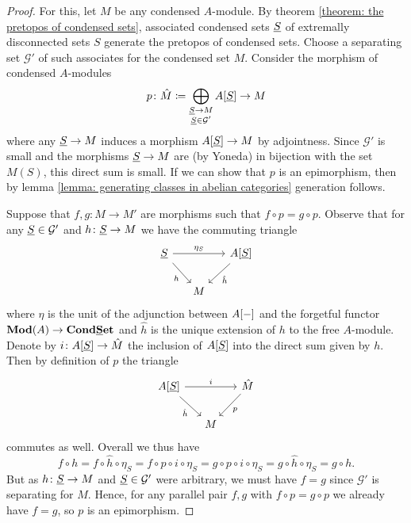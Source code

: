 \begin{proof}
	For this, let $M$ be any condensed $A$-module. By theorem \ref{theorem: the pretopos of condensed sets}, associated condensed sets $\underline{S}$ of extremally disconnected sets $S$ generate the pretopos of condensed sets. Choose a separating set $\mathcal G'$ of such associates for the condensed set $M$. Consider the morphism of condensed $A$-modules
		$$p\colon \hat M\coloneqq \bigoplus_{\substack{\underline{S}\to M\\\underline{S}\in\mathcal G'}} {A[\underline{S}]}\to M$$
	where any $\underline{S}\to M$ induces a morphism ${A[\underline{S}]} \to M$ by adjointness. Since $\mathcal G'$ is small and the morphisms $\underline{S}\to M$ are (by Yoneda) in bijection with the set $M(S)$, this direct sum is small. If we can show that $p$ is an epimorphism, then by lemma \ref{lemma: generating classes in abelian categories} generation follows.
	
	Suppose that $f, g\colon M\to M'$ are morphisms such that $f\circ p = g\circ p$. Observe that for any $\underline{S}\in\mathcal G'$ and $h\colon \underline{S}\to M$ we have the commuting triangle
	$$\begin{tikzcd}
		\associated{S}\ar[rr, "\eta_S"]\ar[dr, "h", swap] &[-1em]&[-1em] \free{A}{\associated{S}}\ar[dl, "\hat h"]\\
		&M
	\end{tikzcd}$$	
	where $\eta$ is the unit of the adjunction between ${A[-]}$ and the forgetful functor ${{\mathbf{Mod}}(A)}\to{{{\mathbf{Cond}}}{{\mathbf{\underline{S}et}}}}$ and $\hat h$ is the unique extension of $h$ to the free $A$-module. Denote by $i\colon {A[\underline{S}]}\to \hat M$ the inclusion of ${A[\underline{S}]}$ into the direct sum given by $h$. Then by definition of $p$ the triangle
	$$\begin{tikzcd}
		\free{A}{\associated{S}}\ar[rr, "i"]\ar[dr, "\hat h", swap] &[-1em]&[-1em] \hat M\ar[dl, "p"]\\
		&M
	\end{tikzcd}$$
	commutes as well. Overall we thus have
		$$f\circ h = f\circ \hat h\circ \eta_S=f\circ p \circ i \circ \eta_S = g\circ p \circ i \circ \eta_S = g\circ \hat h\circ \eta_S = g\circ h.$$
	But as $h\colon \underline{S}\to M$ and $\underline{S}\in\mathcal G'$ were arbitrary, we must have $f=g$ since $\mathcal G'$ is separating for $M$. Hence, for any parallel pair $f, g$ with $f\circ p = g\circ p$ we already have $f=g$, so $p$ is an epimorphism.
\end{proof}

